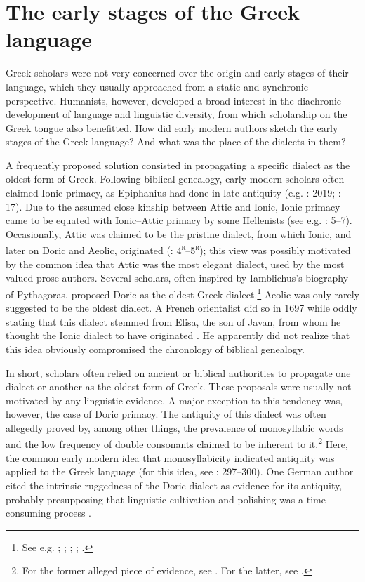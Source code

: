 \section{The early stages of the Greek language}\label{sec:5.4}

Greek scholars were not very concerned over the origin and early stages of their language, which they usually approached from a static and synchronic perspective. Humanists, however, developed a broad interest in the diachronic development of language and linguistic diversity, from which scholarship on the Greek tongue also benefitted. How did early modern authors sketch the early stages of the Greek language? And what was the place of the dialects in them?

A frequently proposed solution consisted in propagating a specific dialect as the oldest form of Greek. Following biblical genealogy, early modern scholars often claimed Ionic primacy, as Epiphanius had done in late antiquity (e.g. \citealt{Alsted1630}: 2019; \citealt{Von1705}: 17). Due to the assumed close kinship between Attic and Ionic, Ionic primacy came to be equated with Ionic–Attic primacy by some Hellenists (see e.g. \citealt{Schmidt1604}: 5–7). Occasionally, Attic was claimed to be the pristine dialect, from which Ionic, and later on Doric and Aeolic, originated (\citealt{Baile1588}: 4\textsc{\textsuperscript{r}}–5\textsc{\textsuperscript{r}}); this view was possibly motivated by the common idea that Attic was the most elegant dialect, used by the most valued prose authors. Several scholars, often inspired by Iamblichus’s biography of Pythagoras, proposed Doric as the oldest Greek dialect.\footnote{See e.g. \citet[860]{Goropius1569}; \citet[29]{Burton1657}; \citet[118]{Mazzocchi1754}; \citet[\textsc{iv}]{Facius1782}; \citet[21]{Gedike1782}.} Aeolic was only rarely suggested to be the oldest dialect. A French orientalist did so in 1697 while oddly stating that this dialect stemmed from Elisa, the son of Javan, from whom he thought the Ionic dialect to have originated \citep[110]{Thomassin1697}. He apparently did not realize that this idea obviously compromised the chronology of biblical genealogy.

In short, scholars often relied on ancient or biblical authorities to propagate one dialect or another as the oldest form of Greek. These proposals were usually not motivated by any linguistic evidence. A major exception to this tendency was, however, the case of Doric primacy. The antiquity of this dialect was often allegedly proved by, among other things, the prevalence of monosyllabic words and the low frequency of double consonants claimed to be inherent to it.\footnote{For the former alleged piece of evidence, see \citet[17]{Munthe1748}. For the latter, see \citet[\textsc{xxvi}]{Harles1778}.} Here, the common early modern idea that monosyllabicity indicated antiquity was applied to the Greek language (for this idea, see \citealt{Jansen1995}: 297–300). One German author cited the intrinsic ruggedness of the Doric dialect as evidence for its antiquity, probably presupposing that linguistic cultivation and polishing was a time-consuming process \citep[21]{Gedike1782}.

